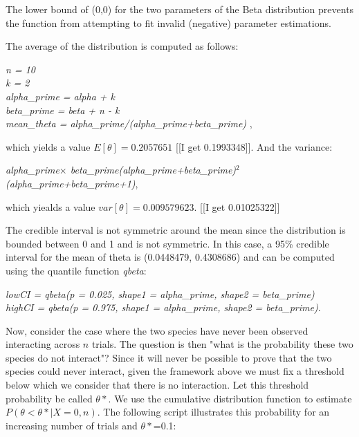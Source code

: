 \documentclass[12pt]{article}
\begin{document}
The lower bound of (0,0) for the two parameters of the Beta distribution prevents the function from attempting to fit invalid (negative) parameter estimations.

The average of the distribution is computed as follows:

  \vspace{12pt}
\noindent
\emph{
    \noindent n = 10
    \\\noindent k = 2
    \\\noindent alpha\_prime = alpha + k
    \\\noindent beta\_prime = beta + n - k
    \\\noindent mean\_theta = alpha\_prime/(alpha\_prime+beta\_prime)
},
  \vspace{12pt}


which yields a value $E[\theta]=0.2057651$ [[I get 0.1993348]]. And the variance:

  \vspace{12pt}
\noindent\emph{alpha\_prime$\times$ beta\_prime\/(alpha\_prime+beta\_prime)$^2$\/(alpha\_prime+beta\_prime+1)},
  \vspace{12pt}


which yiealds a value $var[\theta] = 0.009579623$. [[I get 0.01025322]]


The credible interval is not symmetric around the mean since the distribution is bounded between 0 and 1 and is not symmetric. In this case, a 95\% credible interval for the mean of theta is (0.0448479, 0.4308686) and can be computed using the quantile function \emph{qbeta}:

  \vspace{12pt}
\noindent\emph{
    \noindent lowCI = qbeta(p = 0.025, shape1 = alpha\_prime, shape2 = beta\_prime)
    \\\noindent highCI = qbeta(p = 0.975, shape1 = alpha\_prime, shape2 = beta\_prime)}.
  \vspace{12pt}


Now, consider the case where the two species have never been observed interacting across $n$ trials. The question is then "what is the probability these two species do not interact"? Since it will never be possible to prove that the two species could never interact, given the framework above we must fix a threshold below which we consider that there is no interaction. Let this threshold probability be called $\theta*$. We use the cumulative distribution function to estimate $P(\theta<\theta*|X=0,n)$. The following script illustrates this probability for an increasing number of trials and $\theta*$=0.1:
\end{document}
